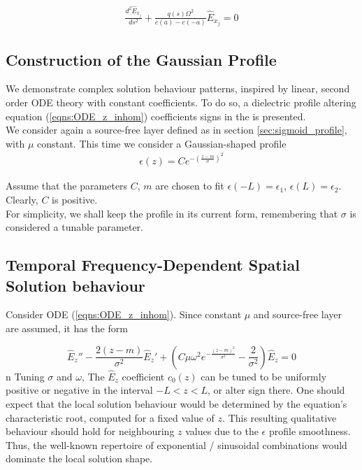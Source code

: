 \documentclass[twocolumn,secnumarabic,amssymb, nobibnotes, aps, prd]{revtex4-1}
\begin{document}
\begin{align}
\label{eqns:ODE_Ex_DimGroup}
\frac{d^2 \hat{E}_{x_j}}{ds^2} + \frac{q(s) \Omega ^2}{c(a)-c(-a)}\hat{E}_{x_j} = 0
\end{align}


\subsection{Construction of the Gaussian Profile}We demonstrate complex solution behaviour patterns, inspired by linear, second order ODE theory with constant coefficients. To do so, a dielectric profile altering equation (\ref{eqns:ODE_z_inhom}) coefficients signs in the is presented. \\

We consider again a source-free layer defined as in section \ref{sec:sigmoid_profile}, with $\mu$ constant. This time we consider a Gaussian-shaped profile
\begin{align}
\epsilon(z) = C e^{-(\frac{z-m}{\sigma})^2}
\label{eqns:Gauss_Profile}
\end{align}

Assume that the parameters $C$, $m$ are chosen to fit $\epsilon(-L)=\epsilon_1$, $\epsilon(L)=\epsilon_2$. Clearly, $C$ is positive.\\
For simplicity, we shall keep the profile in its current form, remembering that $\sigma$ is considered a tunable parameter. 

\subsection{Temporal Frequency-Dependent Spatial Solution behaviour}
Consider ODE (\ref{eqns:ODE_z_inhom}). Since constant $\mu$ and source-free layer are assumed, it has the form

\begin{equation}
 \hat{E}_z'' -\frac{2 (z-m)}{\sigma^2} \hat{E}_z' + \left( C \mu  \omega ^2 e^{-\frac{(z-m)^2}{\sigma
   ^2}}-\frac{2}{\sigma ^2}\right) \hat{E}_z = 0
\label{eqns:source_free_Gaussian_ODE_z}
\end{equation}n
Tuning $\sigma$ and $\omega$,  The $\hat{E}_z$ coefficient $c_0(z)$ can be tuned to be uniformly positive or negative in the interval $-L < z < L$, or alter sign there. One should expect that the local solution behaviour would be determined by the equation's characteristic root, computed for a fixed value of $z$. This resulting qualitative behaviour should hold for neighbouring $z$ values due to the $\epsilon$ profile smoothness. Thus, the well-known repertoire of exponential / sinusoidal combinations would dominate the local solution shape.     
\end{document}
